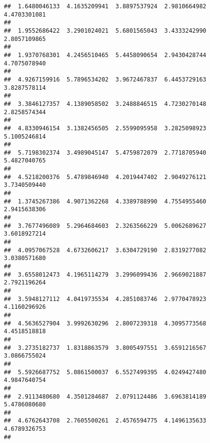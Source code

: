 \documentclass[]{article}
\begin{document}
\begin{verbatim}
##  1.6480046133  4.1635209941  3.8897537924  2.9810664982  4.4703301081 
##                                                                       
##  1.9552686422  3.2901024021  5.6801565043  3.4333242990  2.8057109865 
##                                                                       
##  1.9370768301  4.2456510465  5.4458090654  2.9430428744  4.7075078940 
##                                                                       
##  4.9267159916  5.7896534202  3.9672467837  6.4453729163  3.8287578114 
##                                                                       
##  3.3846127357  4.1389058502  3.2488846515  4.7230270148  2.8258574344 
##                                                                       
##  4.8330946154  3.1382456505  2.5599095958  3.2825098923  5.1005246814 
##                                                                       
##  5.7198302374  3.4989045147  5.4759872079  2.7718705940  5.4827040765 
##                                                                       
##  4.5218200376  5.4789846940  4.2019447402  2.9049276121  3.7340509440 
##                                                                       
##  1.3745267386  4.9071362268  4.3389788990  4.7554955460  2.9415638306 
##                                                                       
##  3.7677496089  5.2964684603  2.3263566229  5.0062689627  3.6018927214 
##                                                                       
##  4.0957067528  4.6732606217  3.6304729190  2.8319277082  3.0380571680 
##                                                                       
##  3.6558012473  4.1965114279  3.2996099436  2.9669021887  2.7921196264 
##                                                                       
##  3.5948127112  4.0419735534  4.2851083746  2.9770478923  4.1160296926 
##                                                                       
##  4.5636527904  3.9992630296  2.8007239318  4.3095773568  4.4518518818 
##                                                                       
##  3.2735182737  1.8318863579  3.8005497551  3.6591216567  3.0866755024 
##                                                                       
##  5.5926687752  5.0861500037  6.5527499395  4.0249427480  4.9847640754 
##                                                                       
##  2.9113480680  4.3501284687  2.0791124486  3.6963814189  5.4786080680 
##                                                                       
##  4.6762643708  2.7605500261  2.4576594775  4.1496135633  4.6789326753 
##                                                                       

\end{verbatim}
\end{document}
